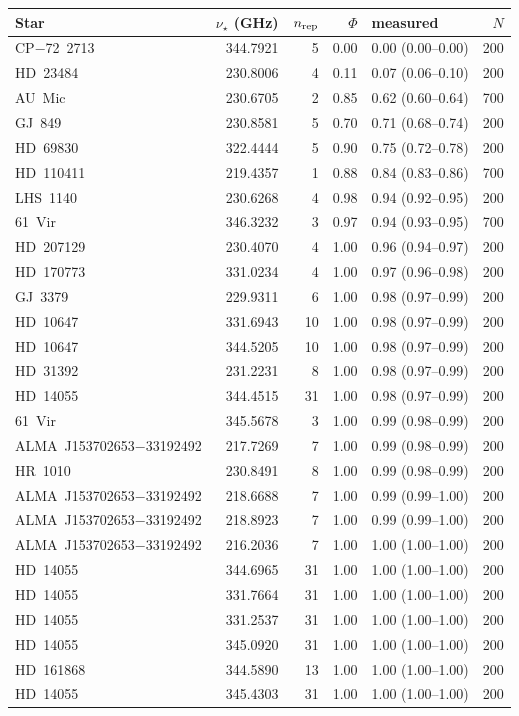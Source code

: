 \begin{tabular}{@{}l@{~~}r@{~~}r@{~~}r@{~~}l@{~~}r@{}}
\hline
Star & $\nu_\star$ (GHz) & $n_{\rm rep}$ & $\Phi$ & measured & $N$ \\
\hline
CP$-$72~2713 & 344.7921 & 5 & 0.00 & 0.00 (0.00--0.00) & 200 \\
HD~23484 & 230.8006 & 4 & 0.11 & 0.07 (0.06--0.10) & 200 \\
AU~Mic & 230.6705 & 2 & 0.85 & 0.62 (0.60--0.64) & 700 \\
GJ~849 & 230.8581 & 5 & 0.70 & 0.71 (0.68--0.74) & 200 \\
HD~69830 & 322.4444 & 5 & 0.90 & 0.75 (0.72--0.78) & 200 \\
HD~110411 & 219.4357 & 1 & 0.88 & 0.84 (0.83--0.86) & 700 \\
LHS~1140 & 230.6268 & 4 & 0.98 & 0.94 (0.92--0.95) & 200 \\
61~Vir & 346.3232 & 3 & 0.97 & 0.94 (0.93--0.95) & 700 \\
HD~207129 & 230.4070 & 4 & 1.00 & 0.96 (0.94--0.97) & 200 \\
HD~170773 & 331.0234 & 4 & 1.00 & 0.97 (0.96--0.98) & 200 \\
GJ~3379 & 229.9311 & 6 & 1.00 & 0.98 (0.97--0.99) & 200 \\
HD~10647 & 331.6943 & 10 & 1.00 & 0.98 (0.97--0.99) & 200 \\
HD~10647 & 344.5205 & 10 & 1.00 & 0.98 (0.97--0.99) & 200 \\
HD~31392 & 231.2231 & 8 & 1.00 & 0.98 (0.97--0.99) & 200 \\
HD~14055 & 344.4515 & 31 & 1.00 & 0.98 (0.97--0.99) & 200 \\
61~Vir & 345.5678 & 3 & 1.00 & 0.99 (0.98--0.99) & 200 \\
ALMA~J153702653$-$33192492 & 217.7269 & 7 & 1.00 & 0.99 (0.98--0.99) & 200 \\
HR~1010 & 230.8491 & 8 & 1.00 & 0.99 (0.98--0.99) & 200 \\
ALMA~J153702653$-$33192492 & 218.6688 & 7 & 1.00 & 0.99 (0.99--1.00) & 200 \\
ALMA~J153702653$-$33192492 & 218.8923 & 7 & 1.00 & 0.99 (0.99--1.00) & 200 \\
ALMA~J153702653$-$33192492 & 216.2036 & 7 & 1.00 & 1.00 (1.00--1.00) & 200 \\
HD~14055 & 344.6965 & 31 & 1.00 & 1.00 (1.00--1.00) & 200 \\
HD~14055 & 331.7664 & 31 & 1.00 & 1.00 (1.00--1.00) & 200 \\
HD~14055 & 331.2537 & 31 & 1.00 & 1.00 (1.00--1.00) & 200 \\
HD~14055 & 345.0920 & 31 & 1.00 & 1.00 (1.00--1.00) & 200 \\
HD~161868 & 344.5890 & 13 & 1.00 & 1.00 (1.00--1.00) & 200 \\
HD~14055 & 345.4303 & 31 & 1.00 & 1.00 (1.00--1.00) & 200 \\
\hline
\end{tabular}
